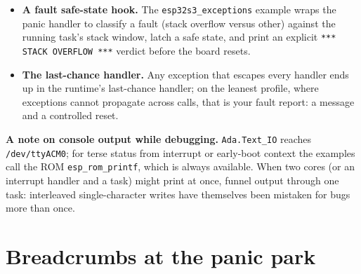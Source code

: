 \begin{itemize}
        The recovery path has one design constraint worth recording: the
        debug-exception handler cannot simply call the raise through an
        assembly trampoline, because Xtensa \texttt{gas} cannot emit CFI and
        an FDE-less frame aborts the ZCX unwinder's walk \textemdash{} the
        exception would never reach its handler.  Instead the handler
        \emph{emulates a \texttt{call4}} from the faulting instruction into
        the runtime's raise procedure (sets the call4-encoded return address
        and \texttt{PS.CALLINC}, then \texttt{rfi}), so the unwinder only
        ever walks real, compiler-described Ada frames.  The redzone is
        2\,KB: the raise and the unwinder's own machinery run on the faulting
        stack \emph{below} the watched line before recovery lands.
  \item \textbf{A fault safe-state hook.} The \texttt{esp32s3\_exceptions}
        example wraps the panic handler to classify a fault (stack overflow
        versus other) against the running task's stack window, latch a safe
        state, and print an explicit \texttt{*** STACK OVERFLOW ***} verdict
        before the board resets.
  \item \textbf{The last-chance handler.} Any exception that escapes every handler
        ends up in the runtime's last-chance handler; on the leanest profile,
        where exceptions cannot propagate across calls, that is your fault report:
        a message and a controlled reset.
\end{itemize}

\textbf{A note on console output while debugging.} \texttt{Ada.Text\_IO} reaches
\texttt{/dev/ttyACM0}; for terse status from interrupt or early-boot context the
examples call the ROM \texttt{esp\_rom\_printf}, which is always available. When
two cores (or an interrupt handler and a task) might print at once, funnel
output through one task: interleaved single-character writes have themselves been
mistaken for bugs more than once.

\section{Breadcrumbs at the panic park}

